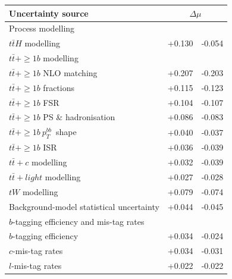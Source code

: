 \begin{center}
\begin{tabular}{l S S}
\toprule
\midrule
Uncertainty source &  \\
\midrule
Process modelling & & \\
\hspace{1em} $t\bar{t}H$  modelling             & +0.130 & -0.054 \\
\hspace{1em} $t\bar{t} + \geq 1b$  modelling & & \\
\hspace{2em} $t\bar{t} + \geq 1b$  NLO matching        & +0.207 & -0.203 \\
\hspace{2em} $t\bar{t} + \geq 1b$  fractions           & +0.115 & -0.123 \\
\hspace{2em} $t\bar{t} + \geq 1b$  FSR                 & +0.104 & -0.107 \\
\hspace{2em} $t\bar{t} + \geq 1b$  PS \& hadronisation & +0.086 & -0.083 \\
\hspace{2em} $t\bar{t} + \geq 1b \ p^{bb}_T$\ shape        & +0.040 & -0.037 \\
\hspace{2em} $t\bar{t} + \geq 1b$  ISR                 & +0.036 & -0.039 \\
\hspace{1em} $t\bar{t} + c$ modelling           & +0.032 & -0.039 \\
\hspace{1em} $t\bar{t} + light$  modelling         & +0.027 & -0.028 \\
\hspace{1em} $tW$ modelling              & +0.079 & -0.074 \\
\hspace{1em} Background-model statistical uncertainty & +0.044 & -0.045 \\
$b$-tagging efficiency and mis-tag rates & & \\
\hspace{1em} $b$-tagging efficiency & +0.034 &-0.024 \\
\hspace{1em} $c$-mis-tag rates      & +0.034 &-0.031 \\
\hspace{1em} $l$-mis-tag rates      & +0.022 &-0.022 \\

\end{tabular}
\end{center}
